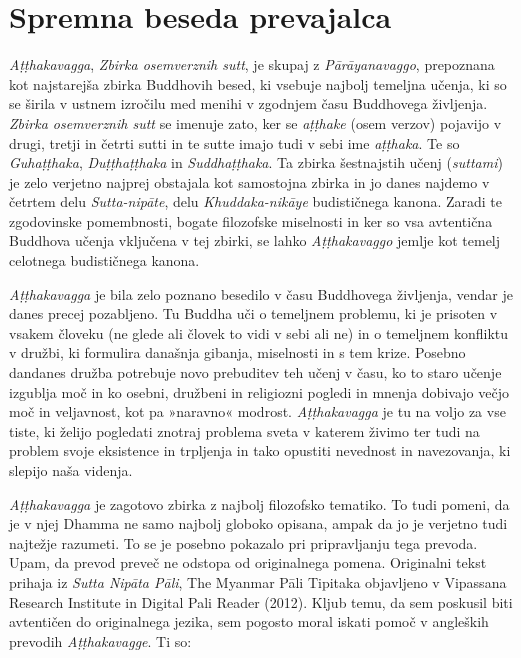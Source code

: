 \chapter{Spremna beseda prevajalca}

\emph{Aṭṭhakavagga}, \emph{Zbirka osemverznih sutt}, je skupaj z
\emph{Pārāyanavaggo}, prepoznana kot najstarejša zbirka Buddhovih besed,
ki vsebuje najbolj temeljna učenja, ki so se širila v ustnem izročilu
med menihi v zgodnjem času Buddhovega življenja. \emph{Zbirka
osemverznih sutt} se imenuje zato, ker se \emph{aṭṭhake} (osem verzov)
pojavijo v drugi, tretji in četrti sutti in te sutte imajo tudi v sebi
ime \emph{aṭṭhaka}. Te so \emph{Guhaṭṭhaka}, \emph{Duṭṭhaṭṭhaka} in
\emph{Suddhaṭṭhaka}. Ta zbirka šestnajstih učenj (\emph{suttami}) je
zelo verjetno najprej obstajala kot samostojna zbirka in jo danes
najdemo v četrtem delu \emph{Sutta-nipāte}, delu \emph{Khuddaka-nikāye}
budističnega kanona. Zaradi te zgodovinske pomembnosti, bogate
filozofske miselnosti in ker so vsa avtentična Buddhova učenja vključena
v tej zbirki, se lahko \emph{Aṭṭhakavaggo} jemlje kot temelj celotnega
budističnega kanona.

\emph{Aṭṭhakavagga} je bila zelo poznano besedilo v času Buddhovega
življenja, vendar je danes precej pozabljeno. Tu Buddha uči o temeljnem
problemu, ki je prisoten v vsakem človeku (ne glede ali človek to vidi v
sebi ali ne) in o temeljnem konfliktu v družbi, ki formulira današnja
gibanja, miselnosti in s tem krize. Posebno dandanes družba potrebuje
novo prebuditev teh učenj v času, ko to staro učenje izgublja moč in ko
osebni, družbeni in religiozni pogledi in mnenja dobivajo večjo moč in
veljavnost, kot pa »naravno« modrost. \emph{Aṭṭhakavagga} je tu na voljo
za vse tiste, ki želijo pogledati znotraj problema sveta v katerem
živimo ter tudi na problem svoje eksistence in trpljenja in tako
opustiti nevednost in navezovanja, ki slepijo naša videnja.

\emph{Aṭṭhakavagga} je zagotovo zbirka z najbolj filozofsko tematiko.
To tudi pomeni, da je v njej Dhamma ne samo najbolj globoko opisana,
ampak da jo je verjetno tudi najtežje razumeti. To se je posebno
pokazalo pri pripravljanju tega prevoda. Upam, da prevod preveč ne
odstopa od originalnega pomena. Originalni tekst prihaja iz
\emph{Sutta Nipāta Pāli}, The Myanmar Pāli Tipitaka objavljeno v
Vipassana Research Institute in Digital Pali Reader (2012). Kljub temu,
da sem poskusil biti avtentičen do originalnega jezika, sem pogosto
moral iskati pomoč v angleških prevodih \emph{Aṭṭhakavagge}. Ti so:

